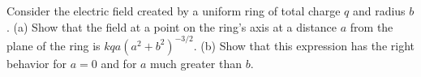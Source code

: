 Consider the electric field created by a uniform ring of
total charge $q$ and radius $b$. (a) Show that the field at
a point on the ring's axis at a distance $a$ from the plane
of the ring is $kqa(a^2+b^2)^{-3/2}$. (b) Show that
this expression has the right behavior for $a=0$ and for $a$
much greater than $b$.
